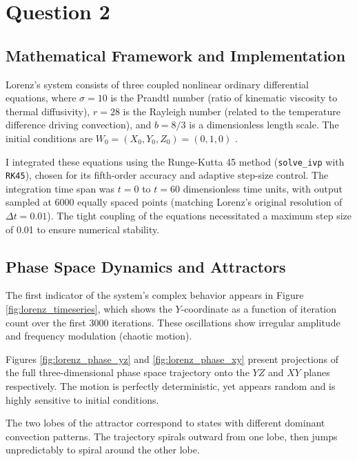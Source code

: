 \documentclass[11pt]{article}
\begin{document}
\newpage

\section{Question 2}

\subsection{Mathematical Framework and Implementation}

Lorenz's system consists of three coupled nonlinear ordinary differential equations, where $\sigma = 10$ is the Prandtl number (ratio of kinematic viscosity to thermal diffusivity), $r = 28$ is the Rayleigh number (related to the temperature difference driving convection), and $b = 8/3$ is a dimensionless length scale. The initial conditions are $W_0 = (X_0, Y_0, Z_0) = (0, 1, 0)$ \cite{lorenz1963}.

I integrated these equations using the Runge-Kutta 45 method (\texttt{solve\_ivp} with \texttt{RK45}), chosen for its fifth-order accuracy and adaptive step-size control. The integration time span was $t = 0$ to $t = 60$ dimensionless time units, with output sampled at 6000 equally spaced points (matching Lorenz's original resolution of $\Delta t = 0.01$). The tight coupling of the equations necessitated a maximum step size of 0.01 to ensure numerical stability.

\subsection{Phase Space Dynamics and Attractors}

The first indicator of the system's complex behavior appears in Figure \ref{fig:lorenz_timeseries}, which shows the $Y$-coordinate as a function of iteration count over the first 3000 iterations. These oscillations show irregular amplitude and frequency modulation (chaotic motion).

Figures \ref{fig:lorenz_phase_yz} and \ref{fig:lorenz_phase_xy} present projections of the full three-dimensional phase space trajectory onto the $YZ$ and $XY$ planes respectively. The motion is perfectly deterministic, yet appears random and is highly sensitive to initial conditions.

The two lobes of the attractor correspond to states with different dominant convection patterns. The trajectory spirals outward from one lobe, then jumps unpredictably to spiral around the other lobe. 
\end{document}
